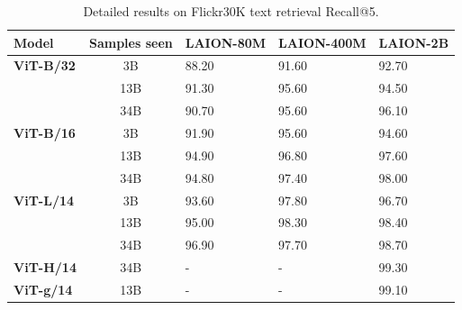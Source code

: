 \begin{appendix}
\begin{table}[tb]
\centering
\small
\begin{tabular}{@{}lclll@{}}
\toprule
\textbf{Model}                     & \textbf{Samples seen} & \textbf{LAION-80M} & \textbf{LAION-400M} & \textbf{LAION-2B} \\ \midrule
\textbf{ViT-B/32} & 3B           & 88.20     & 91.60      & 92.70       \\
                          & 13B          & 91.30     & 95.60       & 94.50       \\
                          & 34B          & 90.70         & 95.60      &96.10        \\ \midrule
\textbf{ViT-B/16} & 3B           & 91.90     & 95.60      & 94.60       \\
                          & 13B          & 94.90     & 96.80       & 97.60       \\
                          & 34B          & 94.80         & 97.40      & 98.00        \\ \midrule                          
\textbf{ViT-L/14} & 3B           & 93.60     & 97.80      & 96.70       \\         
& 13B          & 95.00         & 98.30      & 98.40           \\
                          & 34B          & 96.90         & 97.70       & 98.70       \\ \midrule 
\textbf{ViT-H/14} & 34B           & -     & -      & 99.30       \\         \midrule 
\textbf{ViT-g/14} & 13B           & -     & -      & 99.10       \\         \bottomrule 

\end{tabular}


\caption{Detailed results on Flickr30K text retrieval Recall@5. 
}
\label{table:zeroshot_flickr30k_text_retrieval}
\end{table}


\iffalse
\begin{table}[tb]


\end{table}
\end{appendix}
